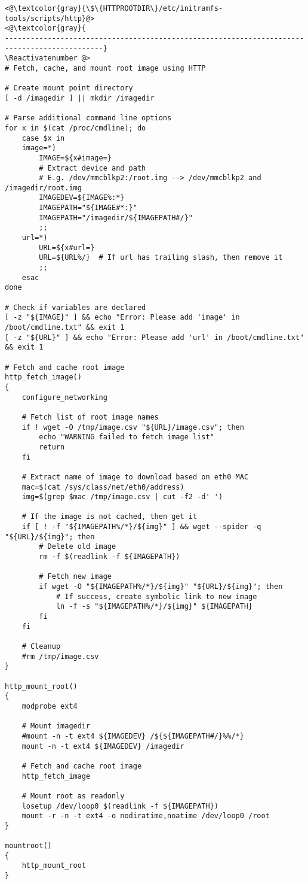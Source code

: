 \Suppressnumber\begin{lstlisting}[]
<@\textcolor{gray}{\$\{HTTPROOTDIR\}/etc/initramfs-tools/scripts/http}@>
<@\textcolor{gray}{
---------------------------------------------------------------------------------------------}
\Reactivatenumber @>
# Fetch, cache, and mount root image using HTTP

# Create mount point directory
[ -d /imagedir ] || mkdir /imagedir

# Parse additional command line options
for x in $(cat /proc/cmdline); do
    case $x in
    image=*)
        IMAGE=${x#image=}
        # Extract device and path
        # E.g. /dev/mmcblkp2:/root.img --> /dev/mmcblkp2 and /imagedir/root.img
        IMAGEDEV=${IMAGE%:*}
        IMAGEPATH="${IMAGE#*:}"
        IMAGEPATH="/imagedir/${IMAGEPATH#/}"
        ;;
    url=*)
        URL=${x#url=}
        URL=${URL%/}  # If url has trailing slash, then remove it
        ;;
    esac
done

# Check if variables are declared
[ -z "${IMAGE}" ] && echo "Error: Please add 'image' in /boot/cmdline.txt" && exit 1
[ -z "${URL}" ] && echo "Error: Please add 'url' in /boot/cmdline.txt" && exit 1

# Fetch and cache root image
http_fetch_image()
{
    configure_networking

    # Fetch list of root image names
    if ! wget -O /tmp/image.csv "${URL}/image.csv"; then
        echo "WARNING failed to fetch image list"
        return
    fi

    # Extract name of image to download based on eth0 MAC
    mac=$(cat /sys/class/net/eth0/address)
    img=$(grep $mac /tmp/image.csv | cut -f2 -d' ')

    # If the image is not cached, then get it
    if [ ! -f "${IMAGEPATH%/*}/${img}" ] && wget --spider -q "${URL}/${img}"; then
        # Delete old image
        rm -f $(readlink -f ${IMAGEPATH})

        # Fetch new image
        if wget -O "${IMAGEPATH%/*}/${img}" "${URL}/${img}"; then
            # If success, create symbolic link to new image
            ln -f -s "${IMAGEPATH%/*}/${img}" ${IMAGEPATH}
        fi
    fi

    # Cleanup
    #rm /tmp/image.csv
}

http_mount_root()
{
    modprobe ext4

    # Mount imagedir
    #mount -n -t ext4 ${IMAGEDEV} /${${IMAGEPATH#/}%%/*}
    mount -n -t ext4 ${IMAGEDEV} /imagedir

    # Fetch and cache root image
    http_fetch_image

    # Mount root as readonly
    losetup /dev/loop0 $(readlink -f ${IMAGEPATH})
    mount -r -n -t ext4 -o nodiratime,noatime /dev/loop0 /root
}

mountroot()
{
    http_mount_root
}
\end{lstlisting}
\FloatBarrier
\vspace{-5mm}

